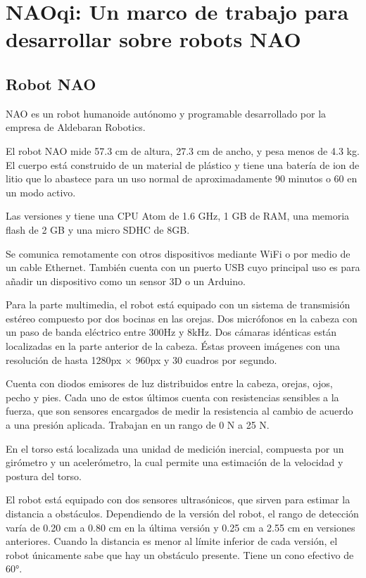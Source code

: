 \section{NAOqi: Un marco de trabajo para desarrollar sobre robots NAO}
\label{\detokenize{chapter_one/naoqi:naoqi-un-marco-de-trabajo-para-desarrollar-sobre-robots-nao}}\label{\detokenize{chapter_one/naoqi::doc}}


\subsection{Robot NAO}
\label{\detokenize{chapter_one/naoqi:nao}}
NAO es un robot humanoide autónomo y programable desarrollado por la empresa de
Aldebaran Robotics.

El robot NAO mide 57.3 cm de altura, 27.3 cm de ancho, y pesa menos de 4.3 kg.
El cuerpo está construido de un material de plástico y tiene una batería de ion
de litio que lo abastece para un uso normal de aproximadamente
90 minutos o 60 en un modo activo.

Las versiones  y  tiene una CPU Atom de 1.6 GHz, 1 GB de RAM, una
memoria flash de 2 GB y una micro SDHC de 8GB.

Se comunica remotamente con otros dispositivos mediante WiFi o por medio de un
cable Ethernet. También cuenta con un puerto USB cuyo principal uso es para
añadir un dispositivo como un sensor 3D o un Arduino.

Para la parte multimedia, el robot está equipado con un sistema de transmisión
estéreo compuesto por dos bocinas en las orejas. Dos micrófonos en la cabeza
con un paso de banda eléctrico entre 300Hz y 8kHz. Dos cámaras idénticas están
localizadas en la parte anterior de la cabeza. Éstas proveen imágenes con una
resolución de hasta 1280px $\times$ 960px y 30 cuadros por segundo.

Cuenta con diodos emisores de luz distribuidos entre la cabeza, orejas, ojos, pecho y pies. Cada
uno de estos últimos cuenta con resistencias sensibles a la fuerza, que son
sensores encargados de medir la resistencia al cambio de acuerdo a una presión
aplicada. Trabajan en un rango de 0 N a 25 N.

En el torso está localizada una unidad de medición inercial, compuesta por un
girómetro y un acelerómetro, la cual permite una estimación de la velocidad
y postura del torso.

El robot está equipado con dos sensores ultrasónicos, que sirven para estimar
la distancia a obstáculos. Dependiendo de la versión del robot, el rango de
detección varía de 0.20 cm a 0.80 cm en la última versión y 0.25 cm a 2.55 cm
en versiones anteriores. Cuando la distancia es menor al límite inferior de
cada versión, el robot únicamente sabe que hay un obstáculo presente.
Tiene un cono efectivo de 60°.

